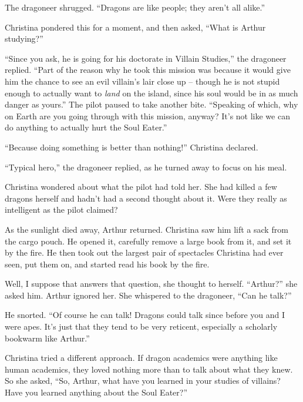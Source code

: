 \documentclass[showtrims,b6paper,draft,10pt]{memoir}
\begin{document}
The dragoneer shrugged.  ``Dragons are like people;  they aren't all alike.''

Christina pondered this for a moment, and then asked, ``What is Arthur studying?''

``Since you ask, he is going for his doctorate in Villain Studies,''  the dragoneer replied.  ``Part of the reason why he took this mission was because it would give him the chance to see an evil villain's lair close up -- though he is not stupid enough to actually want to \emph{land} on the island, since his soul would be in as much danger as yours.''  The pilot paused to take another bite.  ``Speaking of which, why on Earth are you going through with this mission, anyway?  It's not like we can do anything to actually hurt the Soul Eater.''

``Because doing something is better than nothing!'' Christina declared.

``Typical hero,'' the dragoneer replied, as he turned away to focus on his meal.

Christina wondered about what the pilot had told her.  She had killed a few dragons herself and hadn't had a second thought about it.  Were they really as intelligent as the pilot claimed?

As the sunlight died away, Arthur returned.  Christina saw him lift a sack from the cargo pouch.  He opened it, carefully remove a large book from it, and set it by the fire.  He then took out the largest pair of spectacles Christina had ever seen, put them on, and started read his book by the fire.

Well, I suppose that answers that question, she thought to herself.  ``Arthur?'' she asked him.  Arthur ignored her.  She whispered to the dragoneer, ``Can he talk?''

He snorted.  ``Of course he can talk!  Dragons could talk since before you and I were apes.  It's just that they tend to be very reticent, especially a scholarly bookwarm like Arthur.''

Christina tried a different approach.  If dragon academics were anything like human academics, they loved nothing more than to talk about what they knew.  So she asked, ``So, Arthur, what have you learned in your studies of villains?  Have you learned anything about the Soul Eater?''
\end{document}
